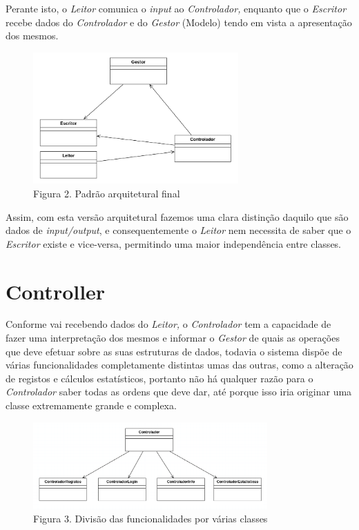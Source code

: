     Perante isto, o \textit{Leitor} comunica o \textit{input} ao \textit{Controlador,} enquanto que o \textit{Escritor} recebe dados do \textit{Controlador} e do \textit{Gestor} (Modelo) tendo em vista a apresentação dos mesmos.
    
    \begin{figure}[t]
        \centering
        \includegraphics[width=0.7\textwidth]{imagens/7.png}
        \caption*{Figura 2. Padrão arquitetural final}
    \end{figure}
    
    Assim, com esta versão arquitetural fazemos uma clara distinção daquilo que são dados de \textit{input/output}, e consequentemente o \textit{Leitor} nem necessita de saber que o \textit{Escritor} existe e vice-versa, permitindo uma maior independência entre classes.

    \vspace{-5pt}
    \section{Controller}

    Conforme vai recebendo dados do \textit{Leitor,} o \textit{Controlador} tem a capacidade de fazer uma interpretação dos mesmos e informar o \textit{Gestor} de quais as operações que deve efetuar sobre as suas estruturas de dados, todavia o sistema dispõe de várias funcionalidades completamente distintas umas das outras, como a alteração de registos e cálculos estatísticos, portanto não há qualquer razão para o \textit{Controlador} saber todas as ordens que deve dar, até porque isso iria originar uma classe extremamente grande e complexa.

    \begin{figure}[hb!]
        \centering
        \includegraphics[width=0.8\textwidth]{imagens/10.png}
        \caption*{Figura 3. Divisão das funcionalidades por várias classes}
    \end{figure}

